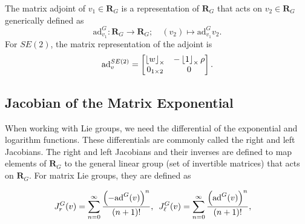 The matrix adjoint of $v_1 \in \mathbf{R}_G$ is a representation of $\mathbf{R}_G$ that acts on $v_2 \in \mathbf{R}_G$ generically defined as 
\begin{equation*}
\text{ad}^G_{v_1}:\mathbf{R}_G\to \mathbf{R}_G; \quad \left( v_2\right)\mapsto \text{ad}^G_{v_1}v_2.
\end{equation*}
%
For $SE(2)$, the matrix representation of the adjoint is
\begin{equation*}
\text{ad}^{SE(2)}_{v} = \begin{bmatrix}
\ss{w} & -\ss{1}\rho \\
0_{1\times 2} & 0
\end{bmatrix}.
\end{equation*}

\subsection{Jacobian of the Matrix Exponential}

When working with Lie groups, we need the differential of the exponential
and logarithm functions. These differentials are commonly called
the right and left Jacobians. The right and left Jacobians and their inverses are defined to map elements of $\mathbf{R}_G$ to the general linear group (set of invertible matrices) that acts on $\mathbf{R}_G$. For matrix Lie groups, they are defined as

\begin{align*}
J_r^G(v) & =\sum_{n=0}^{\infty}\frac{\left(-\text{ad}^{G}(v)\right)^{n}}{\left(n+1\right)!}, \hspace{0.5em}  J_\ell^{G}(v)=\sum_{n=0}^{\infty}\frac{\left(\text{ad}^G(v)\right)^{n}}{\left(n+1\right)!},
\end{align*}

